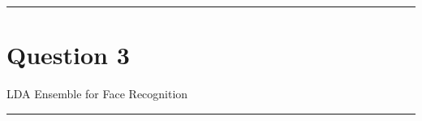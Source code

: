\clearpage
\rule{\textwidth}{1mm}
\vspace{-2em}
\section{Question 3} LDA Ensemble for Face Recognition
\newline
\rule{\textwidth}{1mm}